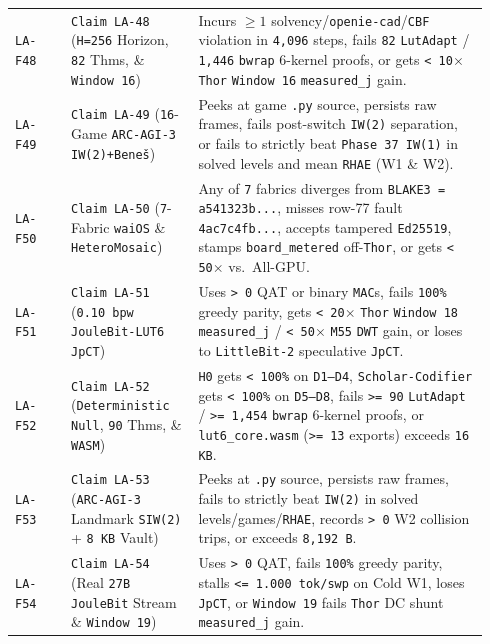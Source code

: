 \documentclass[10pt]{article}
\begin{document}
{\begin{longtable}{@{}L{0.11\linewidth}L{0.25\linewidth}L{0.58\linewidth}@{}}
\texttt{LA-F48} & \texttt{Claim LA-48} (\texttt{H=256} Horizon, \texttt{82} Thms, \& \texttt{Window 16}) & Incurs $\ge 1$ solvency/\texttt{openie-cad}/\texttt{CBF} violation in \texttt{4,096} steps, fails \texttt{82} \texttt{LutAdapt} / \texttt{1,446} \texttt{bwrap} 6-kernel proofs, or gets \texttt{< 10$\times$} \texttt{Thor} \texttt{Window 16} \texttt{measured\_j} gain. \\
\texttt{LA-F49} & \texttt{Claim LA-49} (\texttt{16}-Game \texttt{ARC-AGI-3} \texttt{IW(2)+Bene\v{s}}) & Peeks at game \texttt{.py} source, persists raw frames, fails post-switch \texttt{IW(2)} separation, or fails to strictly beat \texttt{Phase 37 IW(1)} in solved levels and mean \texttt{RHAE} (W1 \& W2). \\
\texttt{LA-F50} & \texttt{Claim LA-50} (\texttt{7}-Fabric \texttt{waiOS} \& \texttt{HeteroMosaic}) & Any of \texttt{7} fabrics diverges from \texttt{BLAKE3 = a541323b...}, misses row-77 fault \texttt{4ac7c4fb...}, accepts tampered \texttt{Ed25519}, stamps \texttt{board\_metered} off-\texttt{Thor}, or gets \texttt{< 50$\times$} vs.\ All-GPU. \\
\texttt{LA-F51} & \texttt{Claim LA-51} (\texttt{0.10 bpw} \texttt{JouleBit-LUT6} \texttt{JpCT}) & Uses \texttt{> 0} QAT or binary \texttt{MAC}s, fails \texttt{100\%} greedy parity, gets \texttt{< 20$\times$} \texttt{Thor} \texttt{Window 18} \texttt{measured\_j} / \texttt{< 50$\times$} \texttt{M55} \texttt{DWT} gain, or loses to \texttt{LittleBit-2} speculative \texttt{JpCT}. \\
\texttt{LA-F52} & \texttt{Claim LA-52} (\texttt{Deterministic Null}, \texttt{90} Thms, \& \texttt{WASM}) & \texttt{H0} gets \texttt{< 100\%} on \texttt{D1--D4}, \texttt{Scholar-Codifier} gets \texttt{< 100\%} on \texttt{D5--D8}, fails \texttt{>= 90} \texttt{LutAdapt} / \texttt{>= 1,454} \texttt{bwrap} 6-kernel proofs, or \texttt{lut6\_core.wasm} (\texttt{>= 13} exports) exceeds \texttt{16 KB}. \\
\texttt{LA-F53} & \texttt{Claim LA-53} (\texttt{ARC-AGI-3} Landmark \texttt{SIW(2)} + \texttt{8 KB} Vault) & Peeks at \texttt{.py} source, persists raw frames, fails to strictly beat \texttt{IW(2)} in solved levels/games/\texttt{RHAE}, records \texttt{> 0} W2 collision trips, or exceeds \texttt{8,192 B}. \\
\texttt{LA-F54} & \texttt{Claim LA-54} (Real \texttt{27B} \texttt{JouleBit} Stream \& \texttt{Window 19}) & Uses \texttt{> 0} QAT, fails \texttt{100\%} greedy parity, stalls \texttt{<= 1.000 tok/swp} on Cold W1, loses \texttt{JpCT}, or \texttt{Window 19} fails \texttt{Thor} DC shunt \texttt{measured\_j} gain. \\

\end{longtable}}
\end{document}
